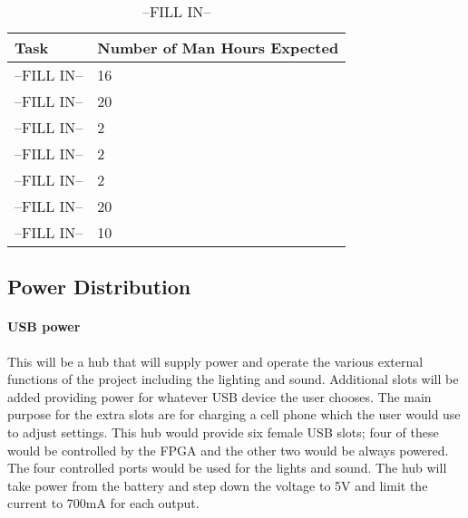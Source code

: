 \documentclass[12pt,article]{IEEEtran}
\begin{document}
       \begin{table}[H]        
            \renewcommand{\arraystretch}{1.3}
        		\caption{--FILL IN--}
    			
    			\label{--FILL IN--}
    			
    			\centering
    			\begin{tabular}{p{4cm}|p{4cm}}
    			\hline
    			\bfseries 	Task 			        	& \bfseries Number of Man Hours Expected        \\
    			\hline\hline
    						--FILL IN-- 		        & 16						    	            \\
    						--FILL IN--    	        	& 20			                                \\	
    						--FILL IN--         	    & 2				                                \\	
    						--FILL IN--             	& 2				                                \\
                            --FILL IN--                 & 2						                        \\
    						--FILL IN--             	& 20			                                \\	
    						--FILL IN--    	            & 10				                            \\	
    					    \hline
    			\end{tabular}
		\end{table}

    \subsection{Power Distribution}
        \paragraph{USB power}
        	This will be a hub that will supply power and operate the various external functions of the 
        	project including the lighting and sound. Additional slots will be added providing power for 
        	whatever USB device the user chooses.  The main purpose for the extra slots are for charging a 
        	cell phone which the user would use to adjust settings. This hub would provide six female USB 
        	slots; four of these would be controlled by the FPGA and the other two would be always powered.
        	The four controlled ports would be used for the lights and sound. The hub will take power from 
        	the battery and step down the voltage to 5V and limit the current to 700mA for each output.
\end{document}

